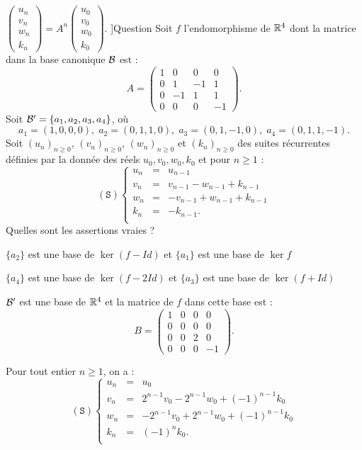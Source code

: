 \begin{multi}
{\(\left(\begin{array}{r}u_n\\v_n\\ w_n\\k_n\end{array}\right) = A^n \left(\begin{array}{r}u_0\\v_0\\ w_0\\k_0\end{array}\right)\).
}]{Question}
Soit \(f\) l'endomorphisme de \(\mathbb{R}^4\) dont la matrice dans la base canonique  \({\cal B}\) est  : 
\[A=\left(\begin{array}{rccc}1&0&0&0\\
0&1&-1&1\\ 0&-1&1&1\\0&0&0&-1\end{array}\right).\]
Soit \({\cal B}' = \{ a_1, a_2,  a_3, a_4\}\), où 
\[a_1=(1,0,0,0),\; a_2=(0,1,1,0),\; a_3=(0,1,-1,0),\; a_4=(0,1,1,-1).\]
Soit \((u_n)_{n\ge 0}\), \((v_n)_{n\ge 0}\), \((w_n)_{n\ge 0}\) et \((k_n)_{n\ge 0}\) des suites récurrentes définies par la donnée
des réels \(u_0, v_0,w_0,k_0\) et pour \(n\ge 1\) :
\[(\mathtt{S})  
\left\{\begin{array}{rcc}
u_n&=&u_{n-1}\\
v_n&=&v_{n-1}-w_{n-1}+k_{n-1}\\ 
w_n&=& -v_{n-1}+w_{n-1}+k_{n-1}\\
k_n&=&-k_{n-1}.\\
\end{array}\right.\]
Quelles sont les assertions vraies ?

    \item \(\{a_2\}\) est une base de \(\ker (f-Id)\) et \(\{a_1\}\) est une base de \(\ker f\)
    \item \(\{a_4 \}\) est une base de \(\ker (f-2Id)\) et  \(\{a_3\}\) est une base de \(\ker (f+Id)\)
    \item* \({\cal B}'\) est une base de \(\mathbb{R}^4\) et la matrice de \(f\) dans cette base est :
\[B=\left(\begin{array}{rccc}1&0&0&0\\0&0&0&0\\
0&0&2&0\\0&0&0&-1\end{array}\right).\]
    \item* Pour tout entier \(n\ge 1\), on a : \[(\mathtt{S})
\left\{\begin{array}{rcc}
u_n&=&u_0\\
v_n&=&2^{n-1}v_0-2^{n-1}w_0+(-1)^{n-1}k_0\\
w_n&=&-2^{n-1}v_0+2^{n-1}w_0+(-1)^{n-1}k_0 \\
k_n&=&(-1)^nk_0.\\
\end{array}\right.\]
\end{multi}


